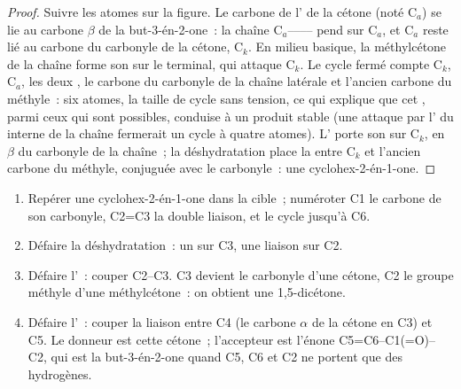 \begin{proof}
Suivre les atomes sur la figure. Le carbone de l' de la cétone (noté C$_a$) se lie au carbone
$\beta$ de la but-3-én-2-one~: la chaîne C$_a$-------- pend sur C$_a$,
et C$_a$ reste lié au carbone du carbonyle de la cétone, C$_k$. En milieu basique, la méthylcétone de
la chaîne forme son  sur le  terminal, qui attaque C$_k$. Le cycle fermé compte C$_k$,
C$_a$, les deux , le carbone du carbonyle de la chaîne latérale et l'ancien carbone du
méthyle~: six atomes, la taille de cycle sans tension, ce qui explique que cet , parmi ceux qui
sont possibles, conduise à un produit stable (une attaque par l' du  interne de la
chaîne fermerait un cycle à quatre atomes). L' porte son  sur C$_k$, en $\beta$ du
carbonyle de la chaîne~; la déshydratation place la  entre C$_k$ et l'ancien carbone du
méthyle, conjuguée avec le carbonyle~: une cyclohex-2-én-1-one.
\end{proof}

\begin{method}\label{met:b2:conjugate-additions:robinson-disconnection}
\begin{enumerate}
  \item Repérer une cyclohex-2-én-1-one dans la cible~; numéroter C1 le carbone de son carbonyle,
        C2=C3 la double liaison, et le cycle jusqu'à C6.
  \item Défaire la déshydratation~: un  sur C3, une liaison  sur C2.
  \item Défaire l'~: couper C2--C3. C3 devient le carbonyle d'une cétone, C2 le groupe
        méthyle d'une méthylcétone~: on obtient une 1,5-dicétone.
  \item Défaire l'~: couper la liaison entre C4 (le carbone $\alpha$ de la cétone en C3)
        et C5. Le donneur est cette cétone~; l'accepteur est l'énone C5=C6--C1(=O)--C2, qui est la
        but-3-én-2-one quand C5, C6 et C2 ne portent que des hydrogènes.
\end{enumerate}
\end{method}

